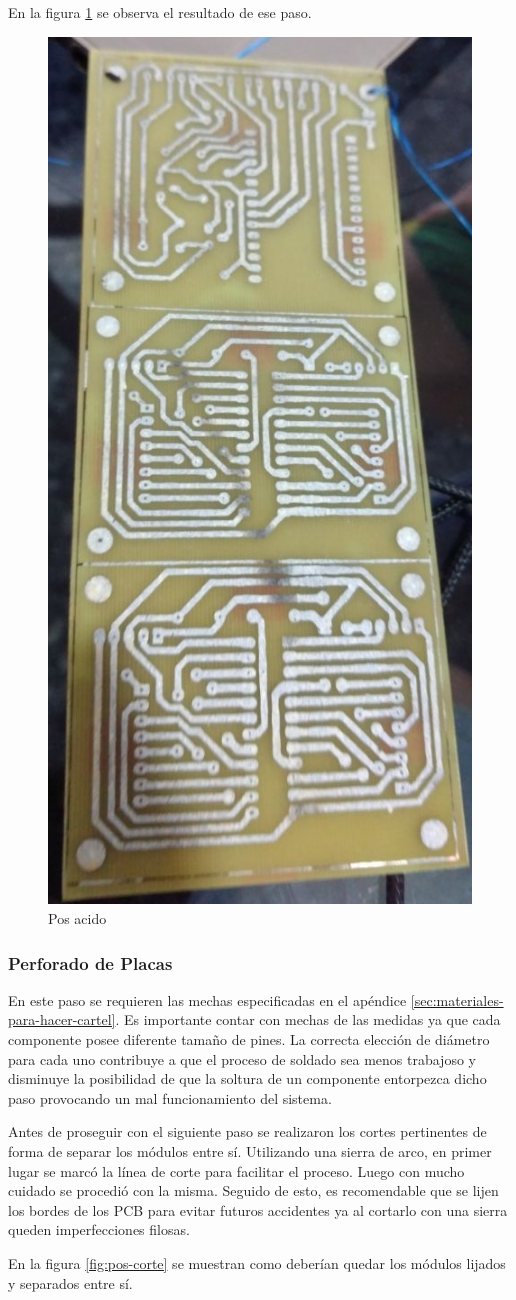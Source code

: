 En la figura \ref{fig:pos-acido} se observa el resultado de ese paso.

\begin{figure}[ht!]
	\centering
	\includegraphics[width=0.36\linewidth]{imagenes/pcbeando/pos-acido-2.jpeg}
	\caption{Pos acido}
	\label{fig:pos-acido}
\end{figure}

\subsubsection{Perforado de Placas}
En este paso se requieren las mechas especificadas en el apéndice \ref{sec:materiales-para-hacer-cartel}. Es importante contar con mechas de las medidas ya que cada componente posee diferente tamaño de pines. La correcta elección de diámetro para cada uno contribuye a que el proceso de soldado sea menos trabajoso y disminuye la posibilidad de que la soltura de un componente entorpezca dicho paso provocando un mal funcionamiento del sistema.

Antes de proseguir con el siguiente paso se realizaron los cortes pertinentes de forma de separar los módulos entre sí. Utilizando una sierra de arco, en primer lugar se marcó la línea de corte para facilitar el proceso.
Luego con mucho cuidado se procedió con la misma. Seguido de esto, es recomendable que se lijen los bordes de los PCB para evitar futuros accidentes ya al cortarlo con una sierra queden imperfecciones filosas.

En la figura \ref{fig:pos-corte} se muestran como deberían quedar los módulos lijados y separados entre sí.

